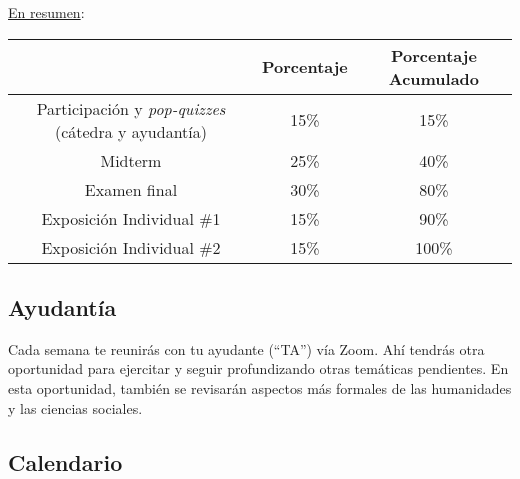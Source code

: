 \documentclass[letterpaper]{article}
\begin{document}
\underline{En resumen}:

\begin{table}[h]
\begin{tabular}{ccc}
							& \textbf{Porcentaje} & {\bf Porcentaje Acumulado} \\
							\hline
Participaci\'on y \emph{pop-quizzes} (c\'atedra y ayudant\'ia) & 15\%       & 15\%                 \\
\hline
Midterm 				& 25\% & 40\%                 \\
Examen final 		& 30\% & 80\%                 \\
\hline
Exposici\'on Individual \#1 	& 15\% & 90\%    \\
Exposici\'on Individual \#2 	& 15\% & 100\%    \\
\hline             
\end{tabular}
\end{table}

\subsection*{Ayudant\'ia}

Cada semana te reunir\'as con tu ayudante (``TA'') v\'ia Zoom. Ah\'i tendr\'as otra oportunidad para ejercitar y seguir profundizando otras tem\'aticas pendientes. En esta oportunidad, tambi\'en se revisar\'an aspectos m\'as formales de las humanidades y las ciencias sociales. 


\subsection*{Calendario}
\end{document}
